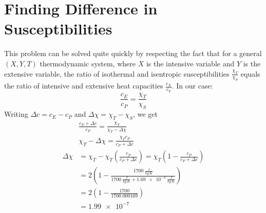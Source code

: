 \documentclass[11pt, a4paper]{article}
\begin{document}
\section*{Finding Difference in Susceptibilities}
This problem can be solved quite quickly by respecting the fact that for a general $ (X, Y, T) $ thermodynamic system, where $ X $ is the intensive variable and $ Y $ is the extensive variable, the ratio of isothermal and isentropic susceptibilities $ \frac{\chi_T}{\chi_S} $ equals the ratio of intensive and extensive heat capacities $ \frac{c_X}{c_Y} $. In our case:
\begin{equation*}
	\frac{c_E}{c_P} = \frac{\chi_T}{\chi_S}
\end{equation*}
Writing $ \Delta c = c_E - c_P $ and $ \Delta \chi = \chi_T - \chi_S $, we get
\begin{align*}
	&\frac{c_P + \Delta c}{c_P} = \frac{\chi_T}{\chi_T - \Delta \chi}\\[1.0ex]
	& \chi_T - \Delta \chi = \frac{\chi_T c_P}{c_P + \Delta c} \\[1.0ex]
	\Delta \chi &= \chi_T - \chi_T\left(\frac{c_P}{c_P + \Delta c}\right) = \chi_T \left(1 - \frac{c_P}{c_P + \Delta c} \right) \\[1.0ex]
	& = 2 \left(1 - \frac{\SI{1700}{\frac{J}{kg\, K}} }{\SI{1700}{\frac{J}{kg\, K}}  + \SI{1.69e-4}{\frac{J}{kg\, K}}} \right)\\[1.0ex]
	& = 2 \left(1 - \frac{1700}{1700.000169} \right) \\[1.0ex]
	& = \SI{1.99e-7}{}
\end{align*}
\end{document}

